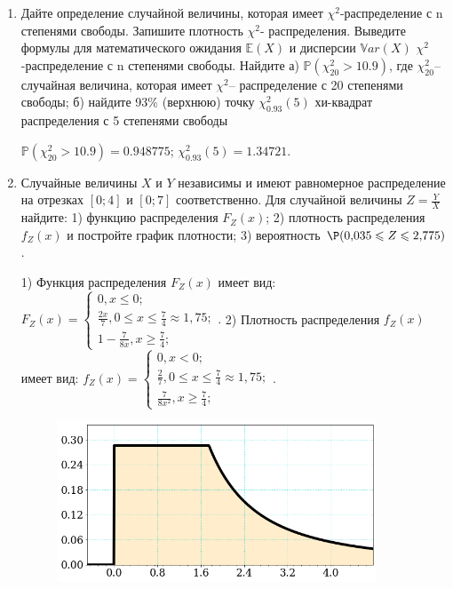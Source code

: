\documentclass[a4paper,14pt]{article}
\begin{document}
\begin{enumerate}


\item


Дайте определение случайной величины, которая имеет $\chi ^{2}$-распределение с n степенями свободы.
Запишите плотность $\chi ^{2}$- распределения. Выведите формулы для математического ожидания $\mathbb{E}(X)$ и дисперсии $\mathbb{V}ar(X)$ $\chi ^{2}$-распределение с n степенями свободы. Найдите а) $\mathbb{P}(\chi _{20}^{2} > 10.9)$, где $\chi _{20}^{2}$–случайная величина, которая имеет $\chi ^{2}$– распределение с 20 степенями свободы; б) найдите 93\%
(верхнюю) точку $\chi _{0.93}^{2} (5)$ хи-квадрат распределения с 5 степенями свободы




$\mathbb{P}(\chi _{20}^{2} > 10.9) =  0.948775$; $\chi _{0.93}^{2} (5) = 1.34721$.


\item



Случайные величины $X$ и $Y$ независимы и имеют равномерное
распределение на отрезках $[0;4]$ и $[0;7]$ соответственно. Для случайной величины $Z=\frac{Y}{X}$ найдите: 
1) функцию распределения $F_Z(x)$;
2) плотность распределения $f_Z(x)$ и постройте график плотности;
3) вероятность $\P(0,\!035\leqslant Z\leqslant 2,\!775)$.




1) Функция распределения $F_Z(x)$ имеет вид:
$
F_Z(x)=\left\{
\begin{array}{l}
0, x\leqslant 0;\\
\frac{2 x}{7}, 0\leqslant x\leqslant \frac{7}{4}\approx 1,\!75;\\
1 - \frac{7}{8 x}, x\geqslant\frac{7}{4};
\end{array}.
\right.
$
2) Плотность распределения $f_Z(x)$ имеет вид:
$
f_Z(x)=\left\{
\begin{array}{l}
0, x<0;\\
\frac{2}{7}, 0\leqslant x\leqslant \frac{7}{4}\approx 1,\!75;\\
\frac{7}{8 x^{2}}, x\geqslant\frac{7}{4};
\end{array}.
\right.
$


\begin{figure}[H]
    \includegraphics[width=0.9\textwidth]{2_53d12}
\end{figure}



\end{enumerate}
\end{document}
